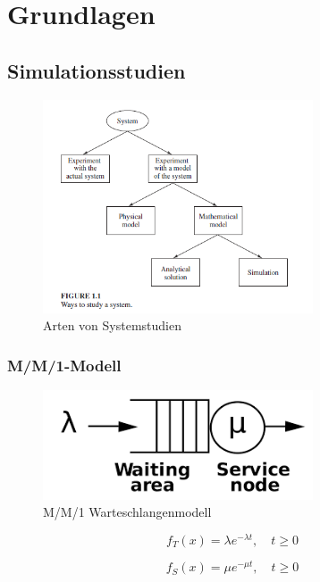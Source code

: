 \chapter{Grundlagen}
\label{chapter:kap2}

\section{Simulationsstudien}

\begin{figure}[h]
	\centering
	\includegraphics[width=8cm]{bilder/system_study}
	\caption{Arten von Systemstudien}
  \label{fig:sysstudy}
\end{figure}

\subsection{M/M/1-Modell}

\begin{figure}[h]
	\centering
	\includegraphics[width=8cm]{bilder/mm1}
	\caption{M/M/1 Warteschlangenmodell}
  \label{fig:mm1}
\end{figure}

\begin{equation}
f_T(x) = \lambda e^{- \lambda t}, \quad t \geq 0
\end{equation}

\begin{equation}
f_S(x) = \mu e^{- \mu t}, \quad t \geq 0
\end{equation}

